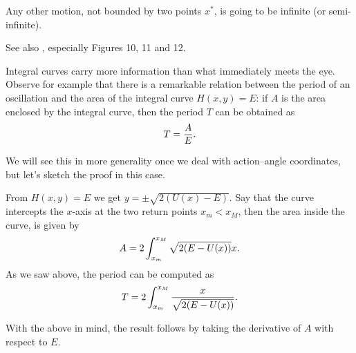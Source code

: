 \documentclass[english,fontsize=11pt,paper=a5,oneside]{scrbook}
\let\d\relax
\DeclareMathOperator{\d}{d}
\theoremstyle{definition}
\newenvironment{remark}
  {\pushQED{\qed}\renewcommand{\qedsymbol}{$\lozenge$}\remarkx}
  {\popQED\endremarkx}
\begin{document}
Any other motion, not bounded by two points $x^*$, is going to be infinite (or semi-infinite).

See also \cite[Chapter 2.4]{book:arnold}, especially Figures 10, 11 and 12.

\begin{remark}
    Integral curves carry more information than what immediately meets the eye.
    Observe for example that there is a remarkable relation between the period of an oscillation and the area of the integral curve $H(x,y) = E$:
    if $A$ is the area enclosed by the integral curve, then the period $T$ can be obtained as
    \begin{equation}
        T = \frac{\d A}{\d E}.
    \end{equation}
    
    We will see this in more generality once we deal with action--angle coordinates, but let's sketch the proof in this case.
    
    From $H(x,y) = E$ we get $y = \pm \sqrt{2(U(x) - E)}$. Say that the curve intercepts the $x$-axis at the two return points $x_m < x_M$, then the area inside the curve, is given by
    \begin{equation}
        A = 2\int_{x_m}^{x_M}\sqrt{2(E - U(x))} \d x.
    \end{equation}
    As we saw above, the period can be computed as
    \begin{equation}
        T = 2\int_{x_m}^{x_M} \frac{\d x}{\sqrt{2(E - U(x))}}.
    \end{equation}
    
    With the above in mind, the result follows by taking the derivative of $A$ with respect to $E$.
\end{remark}
\end{document}
